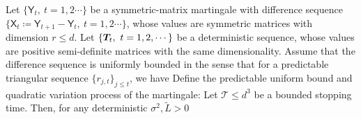\begin{proposition}
\label{prop:friedmanineq}
Let $\{  \mathsf{Y}_t,  ~ t =  1,2 \cdots \}$  be a symmetric-matrix martingale with difference sequence  $\{  \mathsf{X}_{t} \coloneqq \mathsf{Y}_{t+1} - \mathsf{Y}_t ,  ~ t = 1,2 \cdots \}$,  whose values are symmetric matrices with dimension $r \leq d$.  Let    $\{ \boldsymbol{T}_t, ~ t =  1,2,\cdots \}$ be a deterministic sequence,   whose values are positive semi-definite matrices with the same dimensionality.  
Assume that the difference sequence is uniformly bounded in the sense that for a predictable triangular sequence $\{ r_{j, t} \}_{j \leq t}$, we have
 Define the predictable uniform bound and quadratic variation process of the martingale:
Let $\mathcal{T} \leq d^3$ be a bounded stopping time.  Then,  for any deterministic $\sigma^2, \widetilde{L} > 0$
\end{proposition} 

